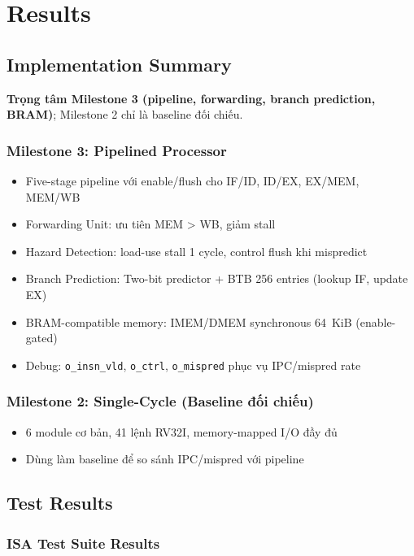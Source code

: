 \chapter{Results}

\section{Implementation Summary}

\textbf{Trọng tâm Milestone 3 (pipeline, forwarding, branch prediction, BRAM)}; Milestone 2 chỉ là baseline đối chiếu.

\subsection{Milestone 3: Pipelined Processor}
\begin{itemize}
    \item Five-stage pipeline với enable/flush cho IF/ID, ID/EX, EX/MEM, MEM/WB
    \item Forwarding Unit: ưu tiên MEM > WB, giảm stall
    \item Hazard Detection: load-use stall 1 cycle, control flush khi mispredict
    \item Branch Prediction: Two-bit predictor + BTB 256 entries (lookup IF, update EX)
    \item BRAM-compatible memory: IMEM/DMEM synchronous 64~KiB (enable-gated)
    \item Debug: \texttt{o\_insn\_vld}, \texttt{o\_ctrl}, \texttt{o\_mispred} phục vụ IPC/mispred rate
\end{itemize}

\subsection{Milestone 2: Single-Cycle (Baseline đối chiếu)}
\begin{itemize}
    \item 6 module cơ bản, 41 lệnh RV32I, memory-mapped I/O đầy đủ
    \item Dùng làm baseline để so sánh IPC/mispred với pipeline
\end{itemize}

\section{Test Results}

\subsection{ISA Test Suite Results}

